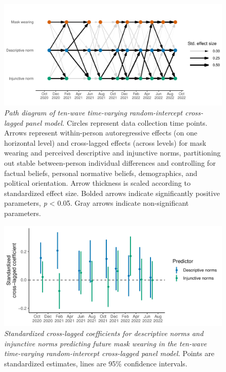 \documentclass[
  man, donotrepeattitle,floatsintext]{apa6}
\begin{document}
\begin{figure}
\centering
\includegraphics{manuscript_files/figure-latex/plotRICLPMPath1-1.pdf}
\caption{\label{fig:plotRICLPMPath1}\emph{Path diagram of ten-wave time-varying random-intercept cross-lagged panel model.} Circles represent data collection time points. Arrows represent within-person autoregressive effects (on one horizontal level) and cross-lagged effects (across levels) for mask wearing and perceived descriptive and injunctive norms, partitioning out stable between-person individual differences and controlling for factual beliefs, personal normative beliefs, demographics, and political orientation. Arrow thickness is scaled according to standardized effect size. Bolded arrows indicate significantly positive parameters, \emph{p} \textless{} 0.05. Gray arrows indicate non-significant parameters.}
\end{figure}



\begin{figure}
\centering
\includegraphics{manuscript_files/figure-latex/plotRICLPMCoef1-1.pdf}
\caption{\label{fig:plotRICLPMCoef1}\emph{Standardized cross-lagged coefficients for descriptive norms and injunctive norms predicting future mask wearing in the ten-wave time-varying random-intercept cross-lagged panel model.} Points are standardized estimates, lines are 95\% confidence intervals.}
\end{figure}
\end{document}
